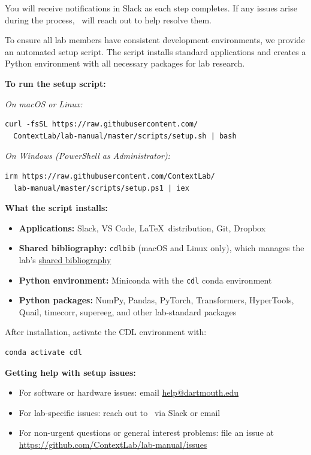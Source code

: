 \documentclass{tufte-book} %
\begin{document}
You will receive notifications in Slack as each step completes. If any issues arise during the process, \director~will reach out to help resolve them.

\label{sec:dev-environment}

\noindent To ensure all lab members have consistent development environments,
we provide an automated setup script. The script installs standard applications
and creates a Python environment with all necessary packages for lab research.


\textbf{To run the setup script:}

\textit{On macOS or Linux:}
\begin{verbatim}
curl -fsSL https://raw.githubusercontent.com/
  ContextLab/lab-manual/master/scripts/setup.sh | bash
\end{verbatim}

\textit{On Windows (PowerShell as Administrator):}
\begin{verbatim}
irm https://raw.githubusercontent.com/ContextLab/
  lab-manual/master/scripts/setup.ps1 | iex
\end{verbatim}

\textbf{What the script installs:}
\begin{itemize}
\item \textbf{Applications:} Slack, VS Code, \LaTeX~distribution, Git, Dropbox
\item \textbf{Shared bibliography:} \texttt{cdlbib} (macOS and Linux only), which manages the lab's \hyperref[sec:bibliography]{shared bibliography}
\item \textbf{Python environment:} Miniconda with the \texttt{cdl} conda environment
\item \textbf{Python packages:} NumPy, Pandas, PyTorch, Transformers, HyperTools,
  Quail, timecorr, supereeg, and other lab-standard packages
\end{itemize}

\noindent After installation, activate the CDL environment with:
\begin{verbatim}
conda activate cdl
\end{verbatim}

\textbf{Getting help with setup issues:}
\begin{itemize}
\item For software or hardware issues: email \href{mailto:help@dartmouth.edu}{help@dartmouth.edu}
\item For lab-specific issues: reach out to \director~via Slack or email
\item For non-urgent questions or general interest problems:
  file an issue at \url{https://github.com/ContextLab/lab-manual/issues}
\end{itemize}
\end{document}
